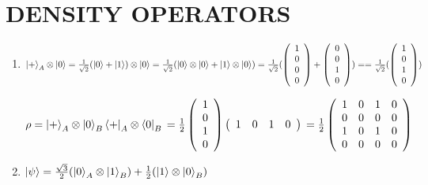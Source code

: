 \documentclass{article}
\begin{document}
\section*{DENSITY OPERATORS}
\begin{enumerate}
    \item $\ket{+}_A\otimes\ket{0}=\frac{1}{\sqrt{2}}(\ket{0}+\ket{1})\otimes\ket{0}=\frac{1}{\sqrt{2}}(\ket{0}\otimes\ket{0}+\ket{1}\otimes\ket{0})
    \\=\frac{1}{\sqrt{2}}(\left(\begin{array}{c}
        1\\0\\0\\0
    \end{array}\right)+\left(\begin{array}{c}
        0\\0\\1\\0
    \end{array}\right))
    \\==\frac{1}{\sqrt{2}}(\left(\begin{array}{c}
        1\\0\\1\\0
    \end{array}\right))
    $



    $\rho
    \\=\ket{+}_A\otimes\ket{0}_B\bra{+}_A\otimes\bra{0}_B
    \\=\frac{1}{2}\left(\begin{array}{c}
        1\\0\\1\\0
    \end{array}\right)\left(\begin{array}{cccc}
        1&0&1&0
    \end{array}\right)
    \\=\frac{1}{2}\left(
        \begin{array}{cccc}
            1&0&1&0\\0&0&0&0\\1&0&1&0\\0&0&0&0
        \end{array}
    \right)
    $
    \item $\ket{\psi}=\frac{\sqrt{3}}{2}(\ket{0}_A\otimes\ket{1}_B)+\frac{1}{2}(\ket{1}\otimes\ket{0}_B)$
    

\end{enumerate}
\end{document}
